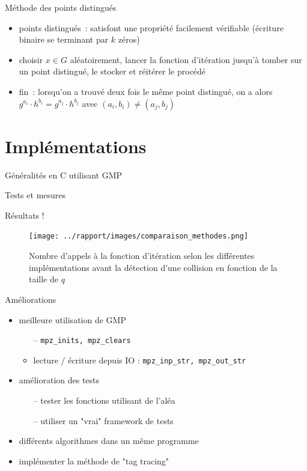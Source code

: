 \documentclass{beamer}
\begin{document}
  \begin{frame}{Méthode des points distingués}
    \begin{itemize}
        \item points distingués~: satisfont une propriété facilement vérifiable (écriture binaire se terminant par $k$ zéros)
        \item choisir $x \in G$ aléatoirement, lancer la fonction d'itération jusqu'à tomber sur un point distingué, le stocker et réitérer le procédé
        \item fin~: lorsqu'on a trouvé deux fois le même point distingué, on a alors $g^{a_i} \cdot h^{b_i} = g^{a_j} \cdot h^{b_j}$ avec $(a_i,b_i) \neq (a_j,b_j)$
    \end{itemize}
  \end{frame}


  \section{Implémentations}

  \begin{frame}{Généralités}
    en C utilisant GMP
  \end{frame}

  \begin{frame}{Tests et mesures}
  \end{frame}

  \begin{frame}{Résultats !}
    \begin{figure}
            \center{}
            \texttt{[image: ../rapport/images/comparaison\_methodes.png]}
            \caption{Nombre d'appels à la fonction d'itération selon les différentes implémentations avant la détection d'une collision en fonction de la taille de $q$}
     \end{figure}
  \end{frame}

  \begin{frame}{Améliorations}
    \begin{itemize}
      \item meilleure utilisation de GMP
        \begin{itemize}
          \item[--] \lstinline{mpz_inits, mpz_clears}
          \item[--] lecture / écriture depuis IO : \lstinline{mpz_inp_str, mpz_out_str}
        \end{itemize}
      \item amélioration des tests
        \begin{itemize}
          \item[--] tester les fonctions utilisant de l'aléa
          \item[--] utiliser un "vrai" framework de tests
        \end{itemize}
      \item différents algorithmes dans un même programme
      \item implémenter la méthode de "tag tracing"
    \end{itemize}
  \end{frame}
\end{document}
